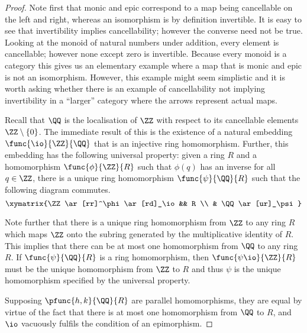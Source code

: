 \documentclass[main.tex]{subfiles}
\begin{document}
\begin{proof}
	Note first that monic and epic correspond to a map being cancellable on the
	left and right, whereas an isomorphism is by definition invertible. It is
	easy to see that invertibility implies cancellability; however the converse
	need not be true. Looking at the monoid of natural numbers under addition,
	every element is cancellable; however none except zero is invertible.
	Because every monoid is a category this gives us an elementary example where
	a map that is monic and epic is not an isomorphism. However, this example
	might seem simplistic and it is worth asking whether there is an example of
	cancellability not implying invertibility in a ``larger'' category where the
	arrows represent actual maps.

	Recall that \(\QQ\) is the localisation of \(\ZZ\) with respect to its
	cancellable elements \(\ZZ\setminus\{0\}\). The immediate result of this is
	the existence of a natural embedding \(\func{\io}{\ZZ}{\QQ}\) that is an
	injective ring homomorphism. Further, this embedding has the following
	universal property: given a ring \(R\) and a homomorphism
	\(\func{\phi}{\ZZ}{R}\) such that \(\phi(q)\) has an inverse for all
	\(q\in\ZZ\), there is a unique ring homomorphism \(\func{\psi}{\QQ}{R}\)
	such that the following diagram commutes.
	\[\xymatrix{\ZZ \ar[rr]^\phi \ar[rd]_\io && R \\ & \QQ \ar[ur]_\psi}\]

	Note further that there is a unique ring homomorphism from \(\ZZ\) to any
	ring \(R\) which maps \(\ZZ\) onto the subring generated by the
	multiplicative identity of \(R\). This implies that there can be at most one
	homomorphism from \(\QQ\) to any ring \(R\). If \(\func{\psi}{\QQ}{R}\) is a
	ring homomorphism, then \(\func{\psi\io}{\ZZ}{R}\) must be the unique
	homomorphism from \(\ZZ\) to \(R\) and thus \(\psi\) is the unique
	homomorphism specified by the universal property.

	Supposing \(\pfunc{h,k}{\QQ}{R}\) are parallel homomorphisms, they are equal
	by virtue of the fact that there is at most one homomorphism from \(\QQ\) to
	\(R\), and \(\io\) vacuously fulfils the condition of an epimorphism.
\end{proof}
\end{document}
